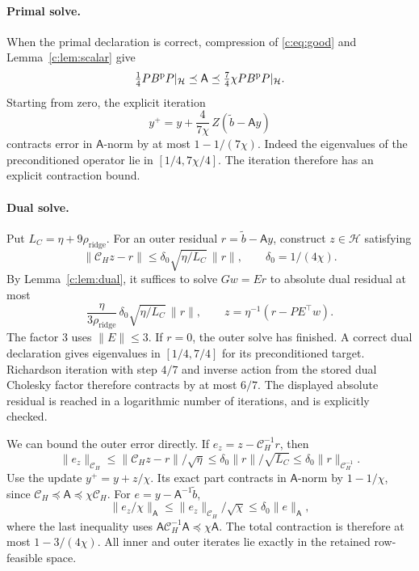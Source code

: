 \documentclass[11pt]{amsart}
\theoremstyle{definition}\newtheorem{definition}[theorem]{Definition}
\theoremstyle{remark}\newtheorem{remark}[theorem]{Remark}
\numberwithin{equation}{section}
\begin{document}
\paragraph{Primal solve.}
When the primal declaration is correct, compression of
\eqref{c:eq:good} and Lemma~\ref{c:lem:scalar} give
\[
 \tfrac14 PB^{\rm p}P|_{\mathcal H}\preceq\mathsf A
 \preceq\tfrac74\chi PB^{\rm p}P|_{\mathcal H}.
\]
Starting from zero, the explicit iteration
\[
 y^+=y+\frac4{7\chi}\,Z(\widetilde b-\mathsf Ay)
\]
contracts error in $\mathsf A$-norm by at most
$1-1/(7\chi)$. Indeed the eigenvalues of the preconditioned
operator lie in $[1/4,7\chi/4]$. The iteration therefore has an explicit contraction bound.

\paragraph{Dual solve.}
Put $L_C=\eta+9\rho_{\mathrm{ridge}}$. For an outer residual
$r=\widetilde b-\mathsf Ay$, construct $z\in\mathcal H$ satisfying
\begin{equation}\label{c:eq:inner}
 \|\mathcal C_Hz-r\|\le\delta_0\sqrt{\eta/L_C}\,\|r\|,
 \qquad\delta_0=1/(4\chi).
\end{equation}
By Lemma~\ref{c:lem:dual}, it suffices to solve $Gw=Er$ to absolute dual
residual at most
\[
 \frac{\eta}{3\rho_{\mathrm{ridge}}}\,
       \delta_0\sqrt{\eta/L_C}\,\|r\|,
 \qquad z=\eta^{-1}(r-PE^\top w).
\]
The factor $3$ uses $\|E\|\le3$. If $r=0$, the outer solve has finished.
A correct dual declaration gives eigenvalues in $[1/4,7/4]$ for its
preconditioned target. Richardson iteration with step $4/7$ and inverse
action from the stored dual Cholesky factor therefore contracts by at
most $6/7$. The displayed absolute residual is reached in a logarithmic
number of iterations, and is explicitly checked.

We can bound the outer error directly.
If $e_z=z-\mathcal C_H^{-1}r$, then
\[
 \|e_z\|_{\mathcal C_H}\le\|\mathcal C_Hz-r\|/\sqrt\eta
 \le\delta_0\|r\|/\sqrt{L_C}
 \le\delta_0\|r\|_{\mathcal C_H^{-1}}.
\]
Use the update $y^+=y+z/\chi$. Its exact part contracts in
$\mathsf A$-norm by $1-1/\chi$, since
$\mathcal C_H\preceq\mathsf A\preceq\chi \mathcal C_H$.
For $e=y-\mathsf A^{-1}\widetilde b$,
\[
 \|e_z/\chi\|_{\mathsf A}
 \le\|e_z\|_{\mathcal C_H}/\sqrt{\chi}
 \le\delta_0\|e\|_{\mathsf A},
\]
where the last inequality uses
$\mathsf A \mathcal C_H^{-1}\mathsf A\preceq\chi\mathsf A$.
The total contraction is therefore at most $1-3/(4\chi)$.
All inner and outer iterates lie exactly in the retained row-feasible space.
\end{document}

